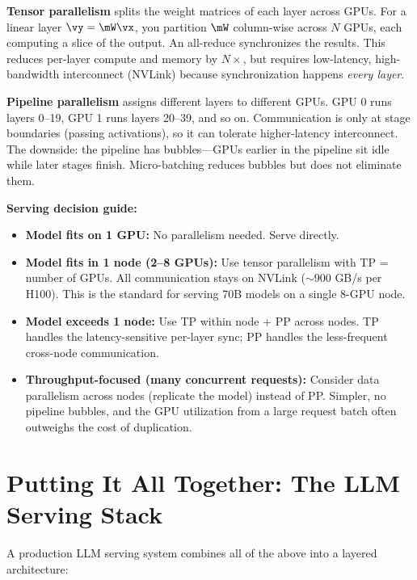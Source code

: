 \textbf{Tensor parallelism} splits the weight matrices of each layer across GPUs. For a linear layer $\vy = \mW\vx$, you partition $\mW$ column-wise across $N$ GPUs, each computing a slice of the output. An all-reduce synchronizes the results. This reduces per-layer compute and memory by $N\times$, but requires low-latency, high-bandwidth interconnect (NVLink) because synchronization happens \textit{every layer}.

\textbf{Pipeline parallelism} assigns different layers to different GPUs. GPU 0 runs layers 0--19, GPU 1 runs layers 20--39, and so on. Communication is only at stage boundaries (passing activations), so it can tolerate higher-latency interconnect. The downside: the pipeline has bubbles---GPUs earlier in the pipeline sit idle while later stages finish. Micro-batching reduces bubbles but does not eliminate them.

\textbf{Serving decision guide:}
\begin{itemize}
    \item \textbf{Model fits on 1 GPU:} No parallelism needed. Serve directly.
    \item \textbf{Model fits in 1 node (2--8 GPUs):} Use tensor parallelism with TP = number of GPUs. All communication stays on NVLink ($\sim$900 GB/s per H100). This is the standard for serving 70B models on a single 8-GPU node.
    \item \textbf{Model exceeds 1 node:} Use TP within node + PP across nodes. TP handles the latency-sensitive per-layer sync; PP handles the less-frequent cross-node communication.
    \item \textbf{Throughput-focused (many concurrent requests):} Consider data parallelism across nodes (replicate the model) instead of PP. Simpler, no pipeline bubbles, and the GPU utilization from a large request batch often outweighs the cost of duplication.
\end{itemize}

\section{Putting It All Together: The LLM Serving Stack}
\label{sec:serving_stack}

A production LLM serving system combines all of the above into a layered architecture:

